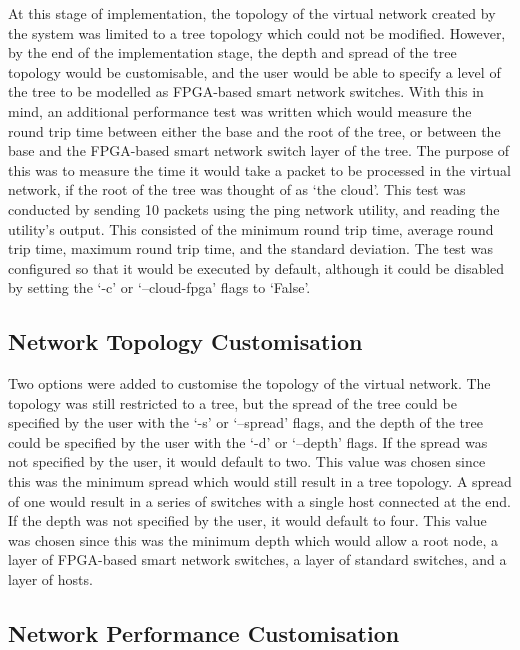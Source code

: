 {At this stage of implementation, the topology of the virtual network created by the system was limited to a tree topology which could not be modified.
However, by the end of the implementation stage, the depth and spread of the tree topology would be customisable, and the user would be able to specify a level of the tree to be modelled as FPGA-based smart network switches.
With this in mind, an additional performance test was written which would measure the round trip time between either the base and the root of the tree, or between the base and the FPGA-based smart network switch layer of the tree.
The purpose of this was to measure the time it would take a packet to be processed in the virtual network, if the root of the tree was thought of as `the cloud'.
This test was conducted by sending 10 packets using the ping network utility, and reading the utility's output.
This consisted of the minimum round trip time, average round trip time, maximum round trip time, and the standard deviation.
The test was configured so that it would be executed by default, although it could be disabled by setting the `-c' or `--cloud-fpga' flags to `False'.

\subsection{Network Topology Customisation}
\label{network_topology_customisation}
Two options were added to customise the topology of the virtual network.
The topology was still restricted to a tree, but the spread of the tree could be specified by the user with the `-s' or `--spread' flags, and the depth of the tree could be specified by the user with the `-d' or `--depth' flags.
If the spread was not specified by the user, it would default to two.
This value was chosen since this was the minimum spread which would still result in a tree topology.
A spread of one would result in a series of switches with a single host connected at the end.
If the depth was not specified by the user, it would default to four.
This value was chosen since this was the minimum depth which would allow a root node, a layer of FPGA-based smart network switches, a layer of standard switches, and a layer of hosts.

\subsection{Network Performance Customisation}
\label{network_performance_customisation}

}
